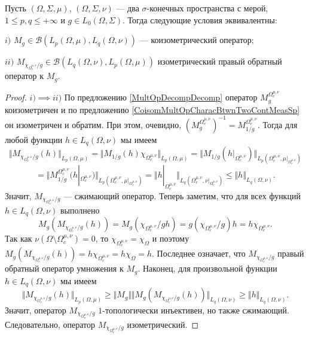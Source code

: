 \begin{proposition}\label{CoisomMultOpDescBtwnTwoMeasSp} Пусть $(\Omega,\Sigma,\mu)$, $(\Omega,\Sigma,\nu)$ --- два $\sigma$-конечных пространства с мерой, $1\leq p,q\leq +\infty$ и $g\in L_0(\Omega,\Sigma)$. Тогда следующие условия эквивалентны: 

$i)$ $M_g\in\mathcal{B}(L_p(\Omega,\mu),L_q(\Omega,\nu))$ --- коизометрический оператор;

$ii)$ $M_{\chi_{\Omega_c^{\mu,\nu}}/g}\in\mathcal{B}(L_q(\Omega,\nu), L_p(\Omega,\mu))$ изометрический  правый обратный оператор к $M_g$.
\end{proposition}
\begin{proof}
$i)$$\implies$$ ii)$ По предложению \ref{MultOpDecompDecomp} оператор $M_g^{\Omega_c^{\mu,\nu}}$ коизометричен и по предложению \ref{CoisomMultOpCharacBtwnTwoContMeasSp} он изометричен и обратим. При этом, очевидно, $(M_g^{\Omega_c^{\mu,\nu}})^{-1}=M_{1/g}^{\Omega_c^{\mu,\nu}}$. Тогда для любой функции $h\in L_q(\Omega,\nu)$ мы имеем
$$
\Vert M_{\chi_{\Omega_c^{\mu,\nu}}/g}(h)\Vert_{L_p(\Omega,\mu)}=
\Vert M_{1/g}(h)\chi_{\Omega_c^{\mu,\nu}}\Vert_{L_p(\Omega,\mu)}=
\Vert M_{1/g}(h|_{\Omega_c^{\mu,\nu}})\Vert_{L_p(\Omega_c^{\mu,\nu},\mu|_{\Omega_c^{\mu,\nu}})}$$
$$
=
\Vert M_{1/g}^{\Omega_c^{\mu,\nu}}(h|_{\Omega_c^{\mu,\nu}})\Vert_{L_p(\Omega_c^{\mu,\nu},\mu|_{\Omega_c^{\mu,\nu}})}
=\Vert h|_{\Omega_c^{\mu,\nu}}\Vert_{L_q(\Omega_c^{\mu,\nu},\nu|_{\Omega_c^{\mu,\nu}})}
\leq\Vert h\Vert_{L_q(\Omega,\nu)}.
$$ 
Значит, $M_{\chi_{\Omega_c^{\mu,\nu}}/g}$ --- сжимающий оператор. Теперь заметим, что для всех функций $h\in L_q(\Omega,\nu)$ выполнено
$$
M_g(M_{\chi_{\Omega_c^{\mu,\nu}}/g}(h))
=M_g(\chi_{\Omega_c^{\mu,\nu}}/g  h)
=g (\chi_{\Omega_c^{\mu,\nu}}/g)   h
=h \chi_{\Omega_c^{\mu,\nu}}.
$$
Так как $\nu(\Omega\setminus\Omega_c^{\mu,\nu})=0$, то $\chi_{\Omega_c^{\mu,\nu}}=\chi_{\Omega}$ и поэтому $M_g(M_{\chi_{\Omega_c^{\mu,\nu}}/g}(h))=h \chi_{\Omega_c^{\mu,\nu}}=h \chi_{\Omega}=h$. Последнее означает, что $M_{\chi_{\Omega_c^{\mu,\nu}}/g}$ правый обратный оператор умножения к $M_g$. Наконец, для произвольной функции $h\in L_q(\Omega,\nu)$ мы имеем
$$
\Vert M_{\chi_{\Omega_c^{\mu,\nu}}/g}(h)\Vert_{L_p(\Omega,\mu)}
\geq\Vert M_g\Vert\Vert M_g(M_{\chi_{\Omega_c^{\mu,\nu}}/g}(h))\Vert_{L_q(\Omega,\nu)}
\geq\Vert h\Vert_{L_q(\Omega,\nu)}.
$$
Значит, оператор $M_{\chi_{\Omega_c^{\mu,\nu}}/g}$ $1$-топологически инъективен, но также сжимающий. Следовательно, оператор $M_{\chi_{\Omega_c^{\mu,\nu}}/g}$ изометрический.


\end{proof}
